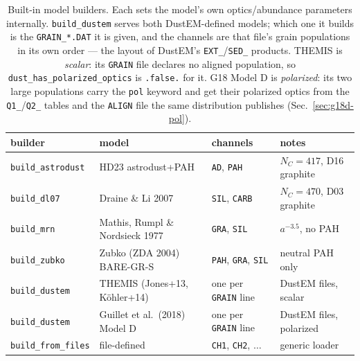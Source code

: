 \documentclass{my_memo}
\newcommand{\code}[1]{\texttt{#1}}
\begin{document}
\begin{table}[h]
\centering
\begin{tabular}{@{}llll@{}}
\toprule
builder & model & channels & notes \\
\midrule
\code{build\_astrodust} & HD23 astrodust+PAH & \code{AD}, \code{PAH} & $N_C{=}417$, D16 graphite \\
\code{build\_dl07}      & Draine \& Li 2007   & \code{SIL}, \code{CARB} & $N_C{=}470$, D03 graphite \\
\code{build\_mrn}       & Mathis, Rumpl \& Nordsieck 1977 & \code{GRA}, \code{SIL} & $a^{-3.5}$, no PAH \\
\code{build\_zubko}     & Zubko (ZDA 2004) BARE-GR-S & \code{PAH}, \code{GRA}, \code{SIL} & neutral PAH only \\
\code{build\_dustem}    & THEMIS (Jones+13, K\"ohler+14) & one per \code{GRAIN} line & DustEM files, scalar \\
\code{build\_dustem}    & Guillet et al.\ (2018) Model D & one per \code{GRAIN} line & DustEM files, polarized \\
\code{build\_from\_files} & file-defined & \code{CH1}, \code{CH2}, $\dots$ & generic loader \\
\bottomrule
\end{tabular}
\caption{Built-in model builders. Each sets the model's own optics/abundance
parameters internally. \code{build\_dustem} serves both DustEM-defined models;
which one it builds is the \code{GRAIN\_*.DAT} it is given, and the channels are
that file's grain populations in its own order --- the layout of DustEM's
\code{EXT\_}/\code{SED\_} products. THEMIS is \emph{scalar}: its \code{GRAIN}
file declares no aligned population, so \code{dust\_has\_polarized\_optics} is
\code{.false.} for it. G18 Model D is \emph{polarized}: its two large
populations carry the \code{pol} keyword and get their polarized optics from the
\code{Q1\_}/\code{Q2\_} tables and the \code{ALIGN} file the same distribution
publishes (Sec.~\ref{sec:g18d-pol}).}
\label{tab:models}
\end{table}
\end{document}
